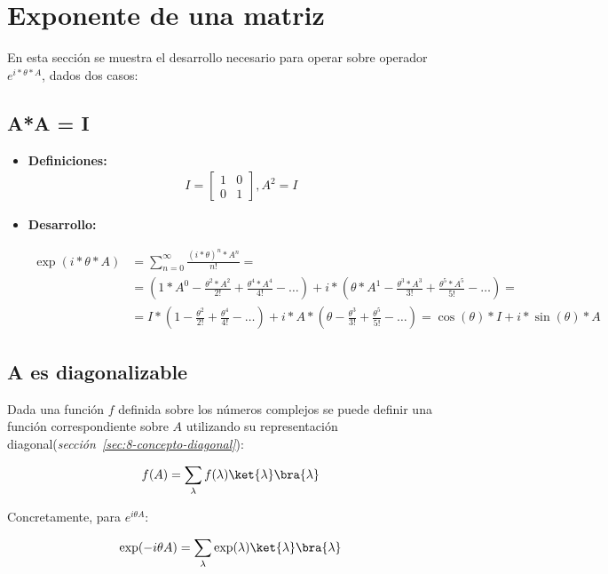 \section{Exponente de una matriz}

En esta sección se muestra el desarrollo necesario para operar sobre operador $e^{i*\theta*A}$, dados dos casos:

\subsection{A*A = I\label{sec:8-A_A_es_I}}

\begin{itemize}
\item \textbf{Definiciones:}
  \begin{align}
    I = \begin{bmatrix}
      1 & 0 \\
      0 & 1
    \end{bmatrix}
    , A^2 = I
  \end{align}

\item \textbf{Desarrollo:}

  \begin{align}
    \exp(i*\theta*A) &= \sum_{n = 0}^{\infty} \frac{{(i*\theta)}^n * A^n}{n!} = \\
                &= (1*A^0 - \frac{\theta^2*A^2}{2!} + \frac{\theta^4*A^4}{4!} - \ldots) +
                  i*(\theta*A^1 - \frac{\theta^3*A^3}{3!} + \frac{\theta^5*A^5}{5!} - \ldots) = \nonumber \\
                &= I*(1 - \frac{\theta^2}{2!} + \frac{\theta^4}{4!} - \ldots) +
                  i*A*(\theta - \frac{\theta^3}{3!} + \frac{\theta^5}{5!} - \ldots)
                  = \cos(\theta)*I + i*\sin(\theta)*A  \nonumber
  \end{align}
\end{itemize}

\subsection{A es diagonalizable\label{sec:8-funcion A diagonalizable}}

Dada una función $f$ definida sobre los números complejos se puede definir una función correspondiente sobre $A$ utilizando su representación diagonal(\textit{sección~\ref{sec:8-concepto-diagonal}}):

\begin{align}
  f(A) = \sum_\lambda f(\lambda) \ket{\lambda}\bra{\lambda}
\end{align}

Concretamente, para $e^{i \theta A}$:

\begin{align}
   \exp( -i \theta A) = \sum_\lambda \exp(\lambda) \ket{\lambda}\bra{\lambda}
\end{align}

